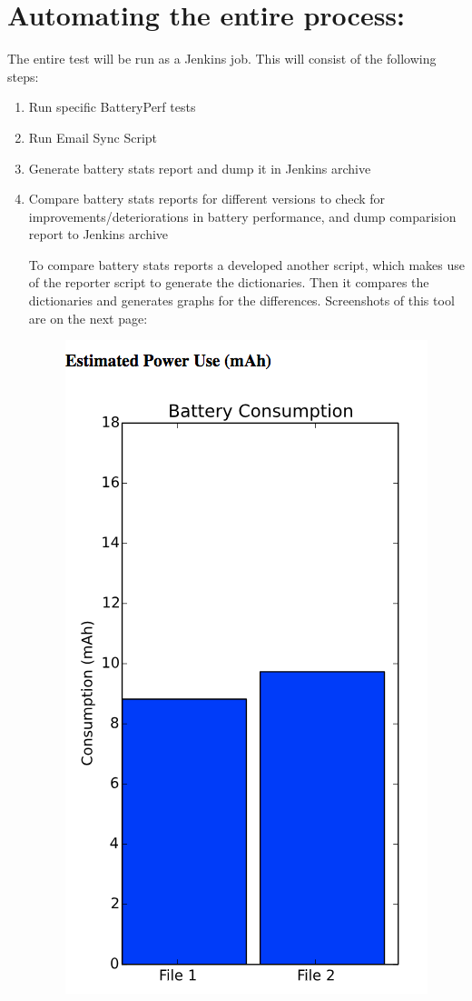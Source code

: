\section{Automating the entire process:} The entire test will be run as a Jenkins job. This will consist of the following steps:
\begin{enumerate}
	\item Run specific BatteryPerf tests
	\item Run Email Sync Script
	\item Generate battery stats report and dump it in Jenkins archive
	\item Compare battery stats reports for different versions to check for improvements/deteriorations in battery performance, and dump comparision report to Jenkins archive

To compare battery stats reports a developed another script, which makes use of the reporter script to generate the dictionaries. Then it compares the dictionaries and generates graphs for the differences. Screenshots of this tool are on the next page:
\begin{figure}[!h]
 	\begin{center}
		\includegraphics[scale=0.6]{diff1}

\end{center}
\end{figure}
\end{enumerate}
